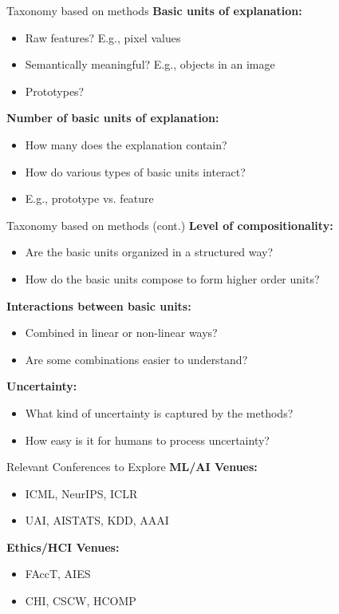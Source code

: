 \documentclass[10pt,aspectratio=169]{beamer}
\begin{document}
\begin{frame}{Taxonomy based on methods}
\textbf{Basic units of explanation:}
\begin{itemize}
\item Raw features? E.g., pixel values
\item Semantically meaningful? E.g., objects in an image
\item Prototypes?
\end{itemize}

\textbf{Number of basic units of explanation:}
\begin{itemize}
\item How many does the explanation contain?
\item How do various types of basic units interact?
\item E.g., prototype vs. feature
\end{itemize}
\end{frame}

\begin{frame}{Taxonomy based on methods (cont.)}
\textbf{Level of compositionality:}
\begin{itemize}
\item Are the basic units organized in a structured way?
\item How do the basic units compose to form higher order units?
\end{itemize}

\textbf{Interactions between basic units:}
\begin{itemize}
\item Combined in linear or non-linear ways?
\item Are some combinations easier to understand?
\end{itemize}

\textbf{Uncertainty:}
\begin{itemize}
\item What kind of uncertainty is captured by the methods?
\item How easy is it for humans to process uncertainty?
\end{itemize}
\end{frame}

\begin{frame}{Relevant Conferences to Explore}
\textbf{ML/AI Venues:}
\begin{itemize}
\item ICML, NeurIPS, ICLR
\item UAI, AISTATS, KDD, AAAI
\end{itemize}

\textbf{Ethics/HCI Venues:}
\begin{itemize}
\item FAccT, AIES
\item CHI, CSCW, HCOMP
\end{itemize}
\end{frame}
\end{document}
